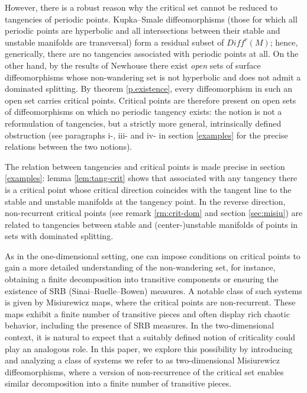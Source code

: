\documentclass[a4paper,11pt]{article}
\theoremstyle{definition}
\begin{document}
However, there is a robust reason why the critical set cannot be reduced to tangencies
of periodic points. Kupka--Smale diffeomorphisms (those for which all
periodic points are hyperbolic and all intersections between their stable and
unstable manifolds are transversal) form a residual subset of
$Diff^r(M)$; hence, generically, there are no tangencies associated with
periodic points at all. On the other hand, by the results of Newhouse
\cite{N} there exist \emph{open} sets of surface diffeomorphisms whose
non-wandering set is not hyperbolic and does not admit a dominated splitting.
By theorem \ref{p.existence}, every diffeomorphism in such an open set
carries critical points. Critical points are therefore present on open sets
of diffeomorphisms on which no periodic tangency exists: the notion is not a
reformulation of tangencies, but a strictly more general, intrinsically
defined obstruction (see paragraphs i-, iii- and iv- in section
\ref{examples} for the precise relations between the two notions).



 
The relation between tangencies and critical points is made precise in section \ref{examples}: lemma \ref{lem:tang-crit} shows that associated with any tangency there is a critical point whose critical direction coincides with the tangent line to the stable and unstable manifolds at the tangency point. In the reverse direction, non-recurrent critical points (see remark \ref{rm:crit-dom} and section \ref{sec:misiu}) are related to tangencies between stable and (center-)unstable manifolds of points in sets with dominated splitting.


As in the one-dimensional setting, one can impose conditions on critical points to gain a more detailed understanding of the non-wandering set, for instance, obtaining a finite decomposition into transitive components or ensuring the existence of SRB (Sinai–Ruelle–Bowen) measures. A notable class of such systems is given by Misiurewicz maps, where the critical points are non-recurrent. These maps exhibit a finite number of transitive pieces and often display rich chaotic behavior, including the presence of  SRB measures. In the two-dimensional context, it is natural to expect that a suitably defined notion of criticality could play an analogous role. In this paper, we explore this possibility by introducing and analyzing a class of systems we refer to as two-dimensional Misiurewicz diffeomorphisms, where a version of non-recurrence of the critical set enables similar decomposition into a finite number of transitive pieces.
\end{document}
